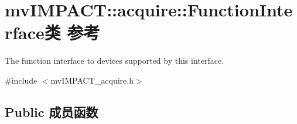 \hypertarget{classmv_i_m_p_a_c_t_1_1acquire_1_1_function_interface}{\section{mv\+I\+M\+P\+A\+C\+T\+:\+:acquire\+:\+:Function\+Interface类 参考}
\label{classmv_i_m_p_a_c_t_1_1acquire_1_1_function_interface}
}


The function interface to devices supported by this interface.  




{\ttfamily \#include $<$mv\+I\+M\+P\+A\+C\+T\+\_\+acquire.\+h$>$}

\subsection*{Public 成员函数}
